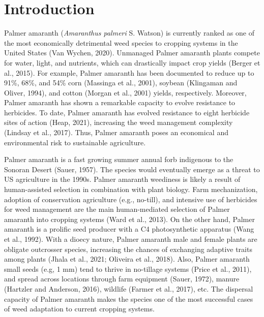 \documentclass[utf8]{frontiersSCNS}
\begin{document}
\hypertarget{introduction}{%
\section*{Introduction}\label{introduction}}

Palmer amaranth (\emph{Amaranthus palmeri} S. Watson) is currently
ranked as one of the most economically detrimental weed species to
cropping systems in the United States (Van Wychen, 2020). Unmanaged
Palmer amaranth plants compete for water, light, and nutrients, which
can drastically impact crop yields (Berger et al., 2015). For example,
Palmer amaranth has been documented to reduce up to 91\%, 68\%, and 54\%
corn (Massinga et al., 2001), soybean (Klingaman and Oliver, 1994), and
cotton (Morgan et al., 2001) yields, respectively. Moreover, Palmer
amaranth has shown a remarkable capacity to evolve resistance to
herbicides. To date, Palmer amaranth has evolved resistance to eight
herbicide sites of action (Heap, 2021), increasing the weed management
complexity (Lindsay et al., 2017). Thus, Palmer amaranth poses an
economical and environmental risk to sustainable agriculture.

Palmer amaranth is a fast growing summer annual forb indigenous to the
Sonoran Desert (Sauer, 1957). The species would eventually emerge as a
threat to US agriculture in the 1990s. Palmer amaranth weediness is
likely a result of human-assisted selection in combination with plant
biology. Farm mechanization, adoption of conservation agriculture (e.g.,
no-till), and intensive use of herbicides for weed management are the
main human-mediated selection of Palmer amaranth into cropping systems
(Ward et al., 2013). On the other hand, Palmer amaranth is a prolific
seed producer with a C4 photosynthetic apparatus (Wang et al., 1992).
With a dioecy nature, Palmer amaranth male and female plants are
obligate outcrosser species, increasing the chances of exchanging
adaptive traits among plants (Jhala et al., 2021; Oliveira et al.,
2018). Also, Palmer amaranth small seeds (e.g, 1 mm) tend to thrive in
no-tillage systems (Price et al., 2011), and spread across locations
through farm equipment (Sauer, 1972), manure (Hartzler and Anderson,
2016), wildlife (Farmer et al., 2017), etc. The dispersal capacity of
Palmer amaranth makes the species one of the most successful cases of
weed adaptation to current cropping systems.
\end{document}
